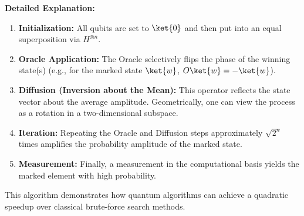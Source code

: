 \noindent
\textbf{Detailed Explanation:}
\begin{enumerate}
  \item \textbf{Initialization:} All qubits are set to \(\ket{0}\) and then
    put into an equal superposition via \(H^{\otimes n}\).

  \item \textbf{Oracle Application:} The Oracle selectively flips the phase
    of the winning state(s) (e.g., for the marked state \(\ket{w}\),
    \(O\ket{w} = -\ket{w}\)).

  \item \textbf{Diffusion (Inversion about the Mean):} This operator reflects
    the state vector about the average amplitude. Geometrically, one can
    view the process as a rotation in a two-dimensional subspace.

  \item \textbf{Iteration:} Repeating the Oracle and Diffusion steps
    approximately \( \sqrt{2^n} \) times amplifies the probability amplitude of
    the marked state.

  \item \textbf{Measurement:} Finally, a measurement in the computational
    basis yields the marked element with high probability.
\end{enumerate}

This algorithm demonstrates how quantum algorithms can achieve a quadratic
speedup over classical brute-force search methods.

